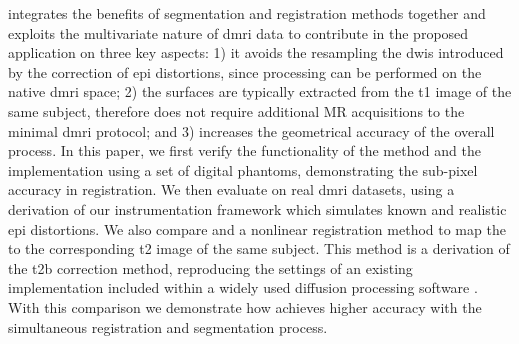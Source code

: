 \Regseg{} integrates the benefits of segmentation and registration methods together and
  exploits the multivariate nature of \gls*{dmri} data to contribute in the proposed
  application on three key aspects:
  1) it avoids the resampling the \glspl*{dwi} introduced by the correction of \gls*{epi}
    distortions, since processing can be performed on the native \gls*{dmri} space;
  2) the surfaces are typically extracted from the \gls*{t1} image of the same subject,
    therefore \regseg{} does not require additional MR acquisitions to the minimal
    \gls*{dmri} protocol; and
  3) \regseg{} increases the geometrical accuracy of the overall process.
In this paper, we first verify the functionality of the method and the \regseg{}
  implementation using a set of digital phantoms, demonstrating the sub-pixel accuracy
  in registration.
We then evaluate \regseg{} on real \gls*{dmri} datasets, using a derivation of our
  instrumentation framework \citep{esteban_simulationbased_2014} which simulates 
  known and realistic \gls*{epi} distortions.
We also compare \regseg{} and a nonlinear registration method to map the \lowb{} to 
  the corresponding \gls*{t2} image of the same subject.
This method is a derivation of the \gls*{t2b} correction method, reproducing the settings
  of an existing implementation included within a widely used diffusion processing software
  \citep{leemans_exploredti_2009}.
With this comparison we demonstrate how \regseg{} achieves higher accuracy with the
  simultaneous registration and segmentation process.